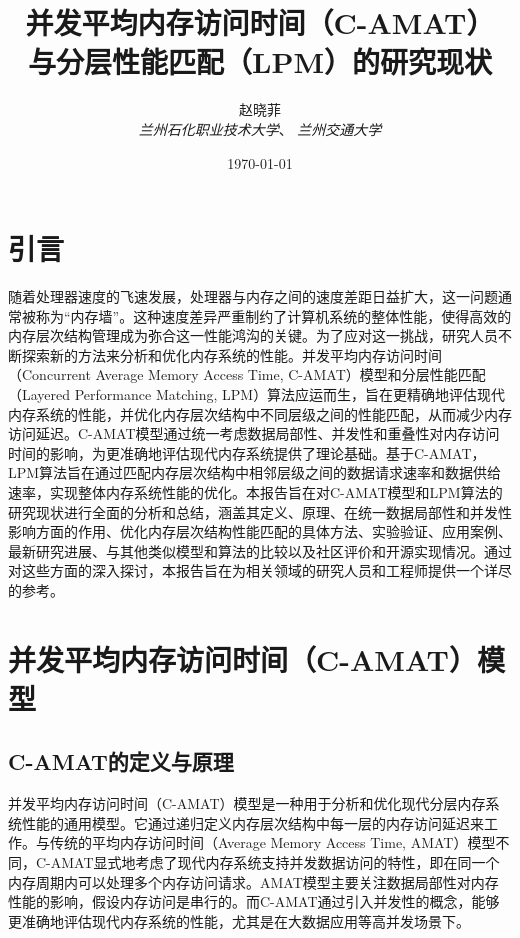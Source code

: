 \documentclass[UTF8]{ctexart}
\title{并发平均内存访问时间（C-AMAT）\\ 与分层性能匹配（LPM）的研究现状}
\author{赵晓菲\\
  \textit{兰州石化职业技术大学}、 %
  \textit{兰州交通大学}} %
\date{\today}
\begin{document}
\maketitle
\tableofcontents

\section{引言}
随着处理器速度的飞速发展，处理器与内存之间的速度差距日益扩大，这一问题通常被称为“内存墙”\cite{ref1}。这种速度差异严重制约了计算机系统的整体性能，使得高效的内存层次结构管理成为弥合这一性能鸿沟的关键。为了应对这一挑战，研究人员不断探索新的方法来分析和优化内存系统的性能。并发平均内存访问时间（Concurrent Average Memory Access Time, C-AMAT）模型和分层性能匹配（Layered Performance Matching, LPM）算法应运而生，旨在更精确地评估现代内存系统的性能，并优化内存层次结构中不同层级之间的性能匹配，从而减少内存访问延迟。C-AMAT模型通过统一考虑数据局部性、并发性和重叠性对内存访问时间的影响，为更准确地评估现代内存系统提供了理论基础。基于C-AMAT，LPM算法旨在通过匹配内存层次结构中相邻层级之间的数据请求速率和数据供给速率，实现整体内存系统性能的优化。本报告旨在对C-AMAT模型和LPM算法的研究现状进行全面的分析和总结，涵盖其定义、原理、在统一数据局部性和并发性影响方面的作用、优化内存层次结构性能匹配的具体方法、实验验证、应用案例、最新研究进展、与其他类似模型和算法的比较以及社区评价和开源实现情况。通过对这些方面的深入探讨，本报告旨在为相关领域的研究人员和工程师提供一个详尽的参考。

\section{并发平均内存访问时间（C-AMAT）模型}

\subsection{C-AMAT的定义与原理}
并发平均内存访问时间（C-AMAT）模型是一种用于分析和优化现代分层内存系统性能的通用模型\cite{sun2022proceedings}。它通过递归定义内存层次结构中每一层的内存访问延迟来工作\cite{sun2022proceedings}。与传统的平均内存访问时间（Average Memory Access Time, AMAT）模型不同，C-AMAT显式地考虑了现代内存系统支持并发数据访问的特性，即在同一个内存周期内可以处理多个内存访问请求\cite{sunCAMATPage}。AMAT模型主要关注数据局部性对内存性能的影响，假设内存访问是串行的\cite{wikiAMAT}。而C-AMAT通过引入并发性的概念，能够更准确地评估现代内存系统的性能，尤其是在大数据应用等高并发场景下\cite{sunCAMATPage}。
\end{document}

